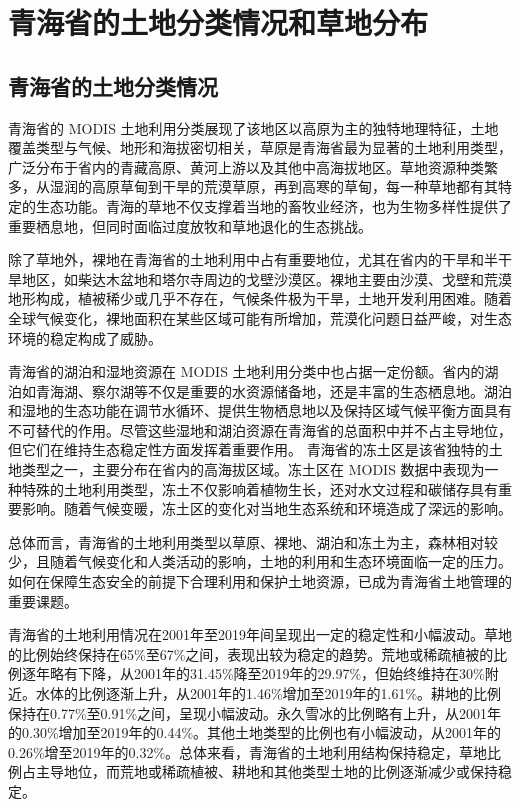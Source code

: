 \documentclass[AutoFakeBold]{LZUThesis-PgD&PhD}
\begin{document}
	
            \section{青海省的土地分类情况和草地分布}
            \subsection{青海省的土地分类情况}
            \par 青海省的 MODIS 土地利用分类展现了该地区以高原为主的独特地理特征，土地覆盖类型与气候、地形和海拔密切相关，草原是青海省最为显著的土地利用类型，广泛分布于省内的青藏高原、黄河上游以及其他中高海拔地区。草地资源种类繁多，从湿润的高原草甸到干旱的荒漠草原，再到高寒的草甸，每一种草地都有其特定的生态功能。青海的草地不仅支撑着当地的畜牧业经济，也为生物多样性提供了重要栖息地，但同时面临过度放牧和草地退化的生态挑战。
            
            除了草地外，裸地在青海省的土地利用中占有重要地位，尤其在省内的干旱和半干旱地区，如柴达木盆地和塔尔寺周边的戈壁沙漠区。裸地主要由沙漠、戈壁和荒漠地形构成，植被稀少或几乎不存在，气候条件极为干旱，土地开发利用困难。随着全球气候变化，裸地面积在某些区域可能有所增加，荒漠化问题日益严峻，对生态环境的稳定构成了威胁。
            
            青海省的湖泊和湿地资源在 MODIS 土地利用分类中也占据一定份额。省内的湖泊如青海湖、察尔湖等不仅是重要的水资源储备地，还是丰富的生态栖息地。湖泊和湿地的生态功能在调节水循环、提供生物栖息地以及保持区域气候平衡方面具有不可替代的作用。尽管这些湿地和湖泊资源在青海省的总面积中并不占主导地位，但它们在维持生态稳定性方面发挥着重要作用。	
            青海省的冻土区是该省独特的土地类型之一，主要分布在省内的高海拔区域。冻土区在 MODIS 数据中表现为一种特殊的土地利用类型，冻土不仅影响着植物生长，还对水文过程和碳储存具有重要影响。随着气候变暖，冻土区的变化对当地生态系统和环境造成了深远的影响。
            
            总体而言，青海省的土地利用类型以草原、裸地、湖泊和冻土为主，森林相对较少，且随着气候变化和人类活动的影响，土地的利用和生态环境面临一定的压力。如何在保障生态安全的前提下合理利用和保护土地资源，已成为青海省土地管理的重要课题。
            
            青海省的土地利用情况在2001年至2019年间呈现出一定的稳定性和小幅波动。草地的比例始终保持在65\%至67\%之间，表现出较为稳定的趋势。荒地或稀疏植被的比例逐年略有下降，从2001年的31.45\%降至2019年的29.97\%，但始终维持在30\%附近。水体的比例逐渐上升，从2001年的1.46\%增加至2019年的1.61\%。耕地的比例保持在0.77\%至0.91\%之间，呈现小幅波动。永久雪冰的比例略有上升，从2001年的0.30\%增加至2019年的0.44\%。其他土地类型的比例也有小幅波动，从2001年的0.26\%增至2019年的0.32\%。总体来看，青海省的土地利用结构保持稳定，草地比例占主导地位，而荒地或稀疏植被、耕地和其他类型土地的比例逐渐减少或保持稳定。
            
\end{document}
